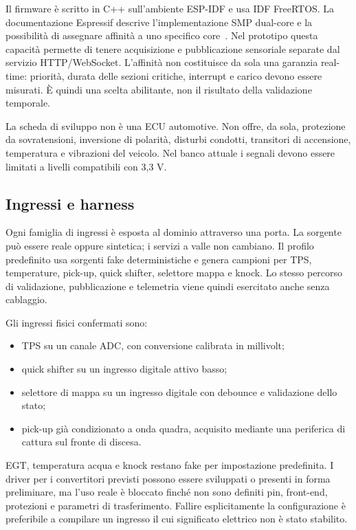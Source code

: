 \documentclass{article}
\begin{document}
Il firmware è scritto in C++ sull'ambiente ESP-IDF e usa IDF FreeRTOS. La
documentazione Espressif descrive l'implementazione SMP dual-core e la possibilità
di assegnare affinità a uno specifico core~\cite{espidf_freertos}. Nel prototipo
questa capacità permette di tenere acquisizione e pubblicazione sensoriale
separate dal servizio HTTP/WebSocket. L'affinità non costituisce da sola una
garanzia real-time: priorità, durata delle sezioni critiche, interrupt e carico
devono essere misurati. È quindi una scelta abilitante, non il risultato della
validazione temporale.

La scheda di sviluppo non è una ECU automotive. Non offre, da sola, protezione
da sovratensioni, inversione di polarità, disturbi condotti, transitori di
accensione, temperatura e vibrazioni del veicolo. Nel banco attuale i segnali
devono essere limitati a livelli compatibili con 3,3 V.

\subsection{Ingressi e harness}

Ogni famiglia di ingressi è esposta al dominio attraverso una porta. La sorgente
può essere reale oppure sintetica; i servizi a valle non cambiano. Il profilo
predefinito usa sorgenti fake deterministiche e genera campioni per TPS,
temperature, pick-up, quick shifter, selettore mappa e knock. Lo stesso percorso
di validazione, pubblicazione e telemetria viene quindi esercitato anche senza
cablaggio.

Gli ingressi fisici confermati sono:

\begin{itemize}
    \item TPS su un canale ADC, con conversione calibrata in millivolt;
    \item quick shifter su un ingresso digitale attivo basso;
    \item selettore di mappa su un ingresso digitale con debounce e validazione
          dello stato;
    \item pick-up già condizionato a onda quadra, acquisito mediante una
          periferica di cattura sul fronte di discesa.
\end{itemize}

EGT, temperatura acqua e knock restano fake per impostazione predefinita. I
driver per i convertitori previsti possono essere sviluppati o presenti in
forma preliminare, ma l'uso reale è bloccato finché non sono definiti pin,
front-end, protezioni e parametri di trasferimento. Fallire esplicitamente la
configurazione è preferibile a compilare un ingresso il cui significato
elettrico non è stato stabilito.
\end{document}
